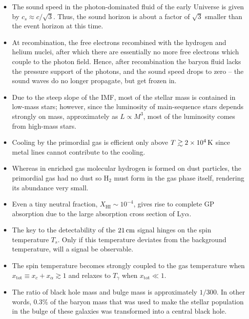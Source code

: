 \documentclass[a4paper,11pt]{article}
\begin{document}
\begin{itemize}
    \item The sound speed in the photon-dominated fluid of the early Universe is given by $c_s\approx c/\sqrt{3}$. Thus, the sound horizon is about a factor of $\sqrt{3}$ smaller than the event horizon at this time.
    \item At recombination, the free electrons recombined with the hydrogen and helium nuclei, after which there are essentially no more free electrons which couple to the photon field. Hence, after recombination the baryon fluid lacks the pressure support of the photons, and the sound speed drops to zero -- the sound waves do no longer propagate, but get frozen in.
    \item Due to the steep slope of the IMF, most of the stellar mass is contained in low-mass stars; however, since the luminosity of main-sequence stars depends strongly on mass, approximately as $L\propto M^3$, most of the luminosity comes from high-mass stars.
    \item Cooling by the primordial gas is efficient only above $T\gtrsim2\times10^4\,{\rm K}$ since metal lines cannot contribute to the cooling.
    \item Whereas in enriched gas molecular hydrogen is formed on dust particles, the primordial gas had no dust so H$_2$ must form in the gas phase itself, rendering its abundance very small.
    \item Even a tiny neutral fraction, $X_\mathrm{HI}\sim10^{-4}$, gives rise to complete GP absorption due to the large absorption cross section of Ly$\alpha$.
    \item The key to the detectability of the $21\,{\rm cm}$ signal hinges on the spin temperature $T_s$. Only if this temperature deviates from the background temperature, will a signal be observable.
    \item The spin temperature becomes strongly coupled to the gas temperature when $x_\mathrm{tot}\equiv x_c+x_\alpha\gtrsim1$ and relaxes to $T_\gamma$ when $x_\mathrm{tot}\ll1$.
    \item The ratio of black hole mass and bulge mass is approximately $1/300$. In other words, 0.3\% of the baryon mass that was used to make the stellar population in the bulge of these galaxies was transformed into a central black hole.
    \end{itemize}
\end{document}
